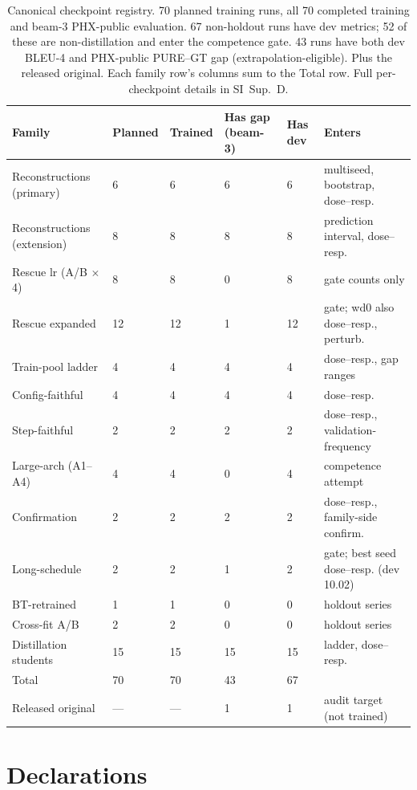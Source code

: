 \documentclass[pdflatex,sn-chicago]{sn-jnl}
\begin{document}
\begin{table}[h]
\centering
\scriptsize\setlength{\tabcolsep}{3pt}
\caption{Canonical checkpoint registry. 70 planned training runs, all 70 completed training and beam-3 PHX-public evaluation. 67 non-holdout runs have dev metrics; 52 of these are non-distillation and enter the competence gate. 43 runs have both dev BLEU-4 and PHX-public PURE--GT gap (extrapolation-eligible). Plus the released original. Each family row's columns sum to the Total row. Full per-checkpoint details in SI~Sup.~D.}
\label{tab:checkpoint_registry_summary}
\begin{tabular}{p{4.2cm}p{1.0cm}p{1.5cm}p{1.4cm}p{1.4cm}p{3.0cm}}
\toprule
Family & Planned & Trained & Has gap (beam-3) & Has dev & Enters \\
\midrule
Reconstructions (primary) & 6 & 6 & 6 & 6 & multiseed, bootstrap, dose--resp. \\
Reconstructions (extension) & 8 & 8 & 8 & 8 & prediction interval, dose--resp. \\
Rescue lr (A/B $\times$ 4) & 8 & 8 & 0 & 8 & gate counts only \\
Rescue expanded & 12 & 12 & 1 & 12 & gate; wd0 also dose--resp., perturb. \\
Train-pool ladder & 4 & 4 & 4 & 4 & dose--resp., gap ranges \\
Config-faithful & 4 & 4 & 4 & 4 & dose--resp. \\
Step-faithful & 2 & 2 & 2 & 2 & dose--resp., validation-frequency \\
Large-arch (A1--A4) & 4 & 4 & 0 & 4 & competence attempt \\
Confirmation & 2 & 2 & 2 & 2 & dose--resp., family-side confirm. \\
Long-schedule & 2 & 2 & 1 & 2 & gate; best seed dose--resp. (dev 10.02) \\
BT-retrained & 1 & 1 & 0 & 0 & holdout series \\
Cross-fit A/B & 2 & 2 & 0 & 0 & holdout series \\
Distillation students & 15 & 15 & 15 & 15 & ladder, dose--resp. \\
\midrule
Total & 70 & 70 & 43 & 67 & \\
Released original & --- & --- & 1 & 1 & audit target (not trained) \\
\bottomrule
\end{tabular}
\end{table}

\section*{Declarations}
\end{document}

